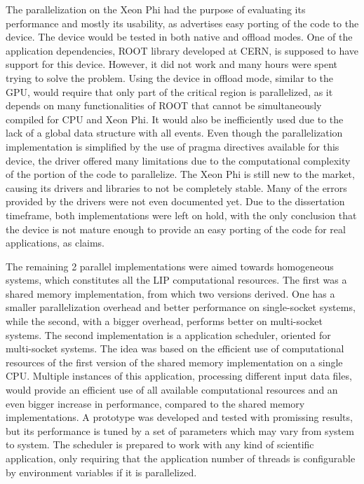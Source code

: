 The parallelization on the \intel Xeon Phi had the purpose of evaluating its performance and mostly its usability, as \intel advertises easy porting of the code to the device. The device would be tested in both native and offload modes. One of the application dependencies, ROOT library developed at CERN, is supposed to have support for this device. However, it did not work and many hours were spent trying to solve the problem. Using the device in offload mode, similar to the GPU, would require that only part of the critical region is parallelized, as it depends on many functionalities of ROOT that cannot be simultaneously compiled for CPU and Xeon Phi. It would also be inefficiently used due to the lack of a global data structure with all events. Even though the parallelization implementation is simplified by the use of pragma directives available for this device, the driver offered many limitations due to the computational complexity of the portion of the code to parallelize. The Xeon Phi is still new to the market, causing its drivers and libraries to not be completely stable. Many of the errors provided by the drivers were not even documented yet. Due to the dissertation timeframe, both implementations were left on hold, with the only conclusion that the device is not mature enough to provide an easy porting of the code for real applications, as \intel claims.

The remaining 2 parallel implementations were aimed towards homogeneous systems, which constitutes all the LIP computational resources. The first was a shared memory implementation, from which two versions derived. One has a smaller parallelization overhead and better performance on single-socket systems, while the second, with a bigger overhead, performs better on multi-socket systems. The second implementation is a application scheduler, oriented for multi-socket systems. The idea was based on the efficient use of computational resources of the first version of the shared memory implementation on a single CPU. Multiple instances of this application, processing different input data files, would provide an efficient use of all available computational resources and an even bigger increase in performance, compared to the shared memory implementations. A prototype was developed and tested with promissing results, but its performance is tuned by a set of parameters which may vary from system to system. The scheduler is prepared to work with any kind of scientific application, only requiring that the application number of threads is configurable by environment variables if it is parallelized.

